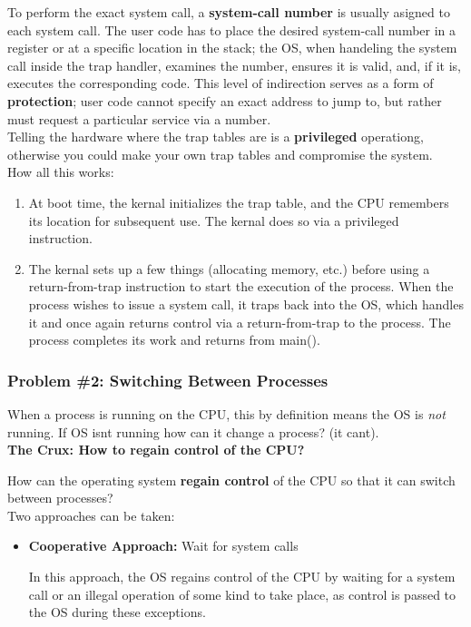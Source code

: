 To perform the exact system call, a \textbf{system-call number} is usually 
asigned to each system call. The user code has to place the desired system-call
number in a register or at a specific location in the stack; the OS, when
handeling the system call inside the trap handler, examines the number,
ensures it is valid, and, if it is, executes the corresponding code. This
level of indirection serves as a form of \textbf{protection}; user code cannot
specify an exact address to jump to, but rather must request a particular 
service via a number.\\

Telling the hardware where the trap tables are is a \textbf{privileged} 
operationg, otherwise you could make your own trap tables and compromise the
system.\\

How all this works:

\begin{enumerate}
    \item At boot time, the kernal initializes the trap table, and the CPU
        remembers its location for subsequent use. The kernal does so via
        a privileged instruction.
    \item The kernal sets up a few things (allocating memory, etc.) before
        using a return-from-trap instruction to start the execution of the 
        process. When the process wishes to issue a system call, it traps back
        into the OS, which handles it and once again returns control via a 
        return-from-trap to the process. The process completes its work and 
        returns from main().
\end{enumerate}

\subsubsection{Problem \#2: Switching Between Processes}

When a process is running on the CPU, this by definition means the OS is
\textit{not} running. If OS isnt running how can
it change a process? (it cant).\\

\textbf{The Crux: How to regain control of the CPU?}

How can the operating system \textbf{regain control} of the CPU so that it can
switch between processes?\\

Two approaches can be taken:

\begin{itemize}
    \item \textbf{Cooperative Approach:} Wait for system calls

        In this approach, the OS regains control of the CPU by waiting for a 
        system call or an illegal operation of some kind to take place, as
        control is passed to the OS during these exceptions.
\end{itemize}

